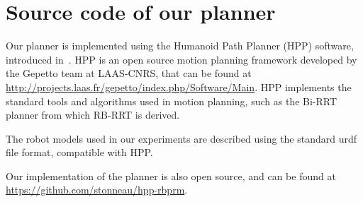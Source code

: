 \section{Source code of our planner}
\label{app:hpp}
Our planner is implemented using the Humanoid Path Planner (HPP) software, introduced in~\cite{7759083}.
HPP is an open source motion planning framework developed by the Gepetto team at LAAS-CNRS, that can be found at \url{http://projects.laas.fr/gepetto/index.php/Software/Main}.
HPP implements the standard tools and algorithms used in motion planning,
such as the Bi-RRT planner from which RB-RRT is derived.

The robot models used in our experiments are described using the standard urdf file format, compatible with HPP.

Our implementation of the planner is also open source, and can be found at \url{https://github.com/stonneau/hpp-rbprm}. 
